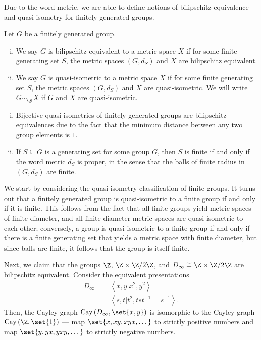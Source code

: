 \documentclass[10pt]{mypackage}
\begin{document}
Due to the word metric, we are able to define notions of bilipschitz equivalence and quasi-isometry for finitely generated groups.
\begin{definition}
  Let $G$ be a finitely generated group.
  \begin{enumerate}[(i)]
    \item We say $G$ is bilipschitz equivalent to a metric space $X$ if for some finite generating set $S$, the metric spaces $\left( G,d_S \right)$ and $X$ are bilipschitz equivalent.
    \item We say $G$ is quasi-isometric to a metric space $X$ if for some finite generating set $S$, the metric spaces $\left( G,d_S \right)$ and $X$ are quasi-isometric. We will write $G\sim_{\operatorname{QI}}X$ if $G$ and $X$ are quasi-isometric.
  \end{enumerate}
\end{definition}
\begin{remark}\hfill
  \begin{enumerate}[(i)]
    \item Bijective quasi-isometries of finitely generated groups are bilipschitz equivalences due to the fact that the minimum distance between any two group elements is $1$.
    \item If $S\subseteq G$ is a generating set for some group $G$, then $S$ is finite if and only if the word metric $d_S$ is proper, in the sense that the balls of finite radius in $\left( G,d_S \right)$ are finite.
  \end{enumerate}
\end{remark}
We start by considering the quasi-isometry classification of finite groups. It turns out that a finitely generated group is quasi-isometric to a finite group if and only if it is finite. This follows from the fact that all finite groups yield metric spaces of finite diameter, and all finite diameter metric spaces are quasi-isometric to each other; conversely, a group is quasi-isometric to a finite group if and only if there is a finite generating set that yields a metric space with finite diameter, but since balls are finite, it follows that the group is itself finite.

Next, we claim that the groups $\Z$, $\Z\times \Z/2\Z$, and $D_{\infty}\cong \Z\rtimes \Z/2\Z$ are bilipschitz equivalent. Consider the equivalent presentations
\begin{align*}
  D_{\infty} &= \left\langle x,y | x^2,y^2\right\rangle\\
             &= \left\langle s,t | t^2,tst^{-1}=s^{-1} \right\rangle.
\end{align*}
Then, the Cayley graph $ \operatorname{Cay}\left( D_{\infty},\set{x,y} \right) $ is isomorphic to the Cayley graph $\operatorname{Cay}\left( \Z,\set{1} \right)$ --- map $\set{x,xy,xyx,\dots}$ to strictly positive numbers and map $\set{y,yx,yxy,\dots}$ to strictly negative numbers.
\end{document}
